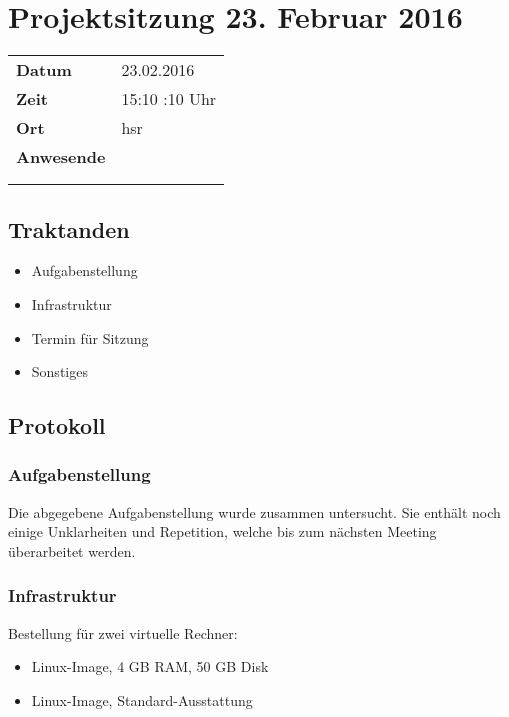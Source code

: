 \documentclass[class=scrbook,crop=false]{standalone}
\begin{document}
	
	\section*{Projektsitzung 23. Februar 2016}
	
	\begin{tabular}{ll}
		\textbf{Datum} & 23.02.2016 \\
		\textbf{Zeit} & 15:10 \textendash 16:10 Uhr \\
		\textbf{Ort} & \acs{hsr} \\
		\textbf{Anwesende} & \proff \\ & \ubos \\ & \pchr
	\end{tabular}
	
	\subsection*{Traktanden}
	\begin{itemize}
		\item Aufgabenstellung
		\item Infrastruktur
		\item Termin für Sitzung
		\item Sonstiges
	\end{itemize}
	
	\subsection*{Protokoll}

	\subsubsection*{Aufgabenstellung}
	
    Die abgegebene Aufgabenstellung wurde zusammen untersucht. Sie enthält noch einige Unklarheiten und Repetition, welche bis zum nächsten Meeting überarbeitet werden.

	\subsubsection*{Infrastruktur}
	
	Bestellung für zwei virtuelle Rechner:
	
	\begin{itemize}
		\item Linux-Image, 4 GB RAM, 50 GB Disk
		\item Linux-Image, Standard-Ausstattung
	\end{itemize}
	
\end{document}
